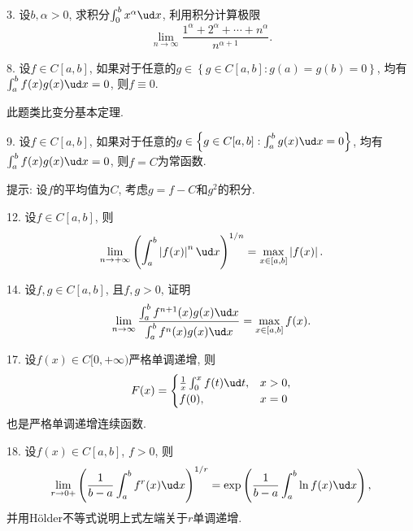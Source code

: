 3. 设$b,\alpha>0$, 求积分$\int_{0}^{b}x^{\alpha}\ud x$, 利用积分计算极限
\[
\lim_{n\to\infty}\frac{1^{\alpha}+2^{\alpha}+\cdots+n^{\alpha}}{n^{\alpha+1}}.
\]

8. 设$f\in C[a,b]$, 如果对于任意的$g\in\left\{ g\in C[a,b]:g(a)=g(b)=0\right\} $,
均有$\int_{a}^{b}f(x)g(x)\ud x=0$, 则$f\equiv0$.

此题类比变分基本定理.

9. 设$f\in C[a,b]$, 如果对于任意的$g\in\left\{ g\in C[a,b]:\int_{a}^{b}g(x)\ud x=0\right\} $,
均有$\int_{a}^{b}f(x)g(x)\ud x=0$, 则$f=C$为常函数.

提示: 设$f$的平均值为$C$, 考虑$g=f-C$和$g^{2}$的积分.

12. 设$f\in C[a,b]$, 则
\[
\lim_{n\to+\infty}\left(\int_{a}^{b}\left|f(x)\right|^{n}\ud x\right)^{1/n}=\max_{x\in[a,b]}\left|f(x)\right|.
\]

14. 设$f,g\in C[a,b]$, 且$f,g>0$, 证明
\[
\lim_{n\to\infty}\frac{\int_{a}^{b}f^{n+1}(x)g(x)\ud x}{\int_{a}^{b}f^{n}(x)g(x)\ud x}=\max_{x\in[a,b]}f(x).
\]

17. 设$f(x)\in C[0,+\infty)$严格单调递增, 则
\[
F(x)=\begin{cases}
\frac{1}{x}\int_{0}^{x}f(t)\ud t, & x>0,\\
f(0), & x=0
\end{cases}
\]
也是严格单调递增连续函数.

18. 设$f(x)\in C[a,b]$, $f>0$, 则
\[
\lim_{r\to0+}\left(\frac{1}{b-a}\int_{a}^{b}f^{r}(x)\ud x\right)^{1/r}=\exp\left(\frac{1}{b-a}\int_{a}^{b}\ln f(x)\ud x\right),
\]
并用H\"{o}lder不等式说明上式左端关于$r$单调递增.
